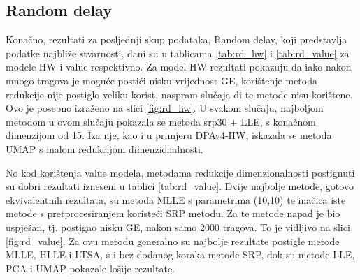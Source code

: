 \documentclass[times, utf8, diplomski]{fer}
\begin{document}
\subsection{Random delay}
Konačno, rezultati za posljednji skup podataka, Random delay, koji predstavlja podatke najbliže stvarnosti, dani su u tablicama \ref{tab:rd_hw} i \ref{tab:rd_value} za modele HW i value respektivno. Za model HW rezultati pokazuju da iako nakon mnogo tragova je moguće postići nisku vrijednost GE, korištenje metoda redukcije nije postiglo veliku korist, naspram slučaja di te metode nisu korištene. Ovo je posebno izraženo na slici \ref{fig:rd_hw}. U svakom slučaju, najboljom metodom u ovom slučaju pokazala se metoda srp30 + LLE, s konačnom dimenzijom od 15. Iza nje, kao i u primjeru DPAv4-HW, iskazala se metoda UMAP s malom redukcijom dimenzionalnosti.

No kod korištenja value modela, metodama redukcije dimenzionalnosti postignuti su dobri rezultati izneseni u tablici \ref{tab:rd_value}. Dvije najbolje metode, gotovo ekvivalentnih rezultata, su metoda MLLE s parametrima (10,10) te inačica iste metode s pretprocesiranjem koristeći SRP metodu. Za te metode napad je bio uspješan, tj. postigao nisku GE, nakon samo 2000 tragova. To je vidljivo na slici \ref{fig:rd_value}. Za ovu metodu generalno su najbolje rezultate postigle metode MLLE, HLLE i LTSA, s i bez dodanog koraka metode SRP, dok su metode LLE, PCA i UMAP pokazale lošije rezultate.
\end{document}
